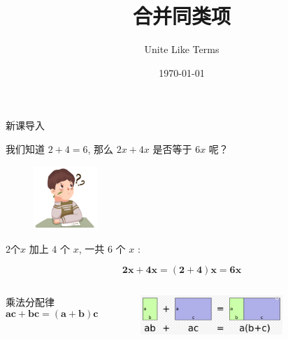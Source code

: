 \documentclass{ctexbeamer}
\title{合并同类项}
\subtitle{Unite Like Terms}
\date{\today}
\begin{document}
\begin{frame}
	\titlepage
\end{frame}

\begin{frame}{新课导入}
	
	\begin{block}{}
	我们知道 $ 2 + 4 = 6 $, 那么 $ 2x + 4x $ 是否等于 $ 6x $ 呢？
	\end{block}
	
	\begin{figure}
		\includegraphics[width = 2.4cm]{assets/Pngtree student thinking.png}
	\end{figure}

	\pause
	\begin{block}{$2$个$x$ 加上  $4$ 个 $x$, 一共  $6$ 个  $x$ :}
		 
		\[
			\bm{2x + 4x = (2 + 4)x = 6x}
		\]
	\end{block}

	\begin{columns}
			\begin{alertblock}{乘法分配律}
				$$ \bm{ac + bc = (a + b)c} $$
			\end{alertblock}
			\begin{figure}
				\includegraphics[width = 0.75\textwidth]{assets/dist law.png}
			\end{figure}
	\end{columns}
	

\end{frame}
\end{document}

